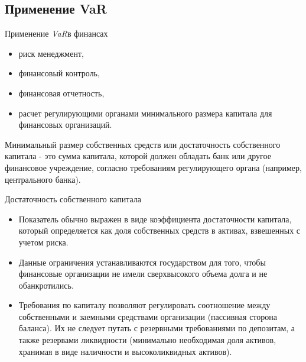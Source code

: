 \documentclass[_fin_decisions_lectures.tex]{subfiles}
\begin{document}
\subsection{Применение VaR}
\begin{frame}{Применение \textit{VaR}в финансах}

\begin{itemize}[<+->]
\item
риск менеджмент, 
\item
финансовый контроль, 
\item
финансовая отчетность,
\item
расчет регулирующими органами минимального размера капитала для финансовых организаций.
\end{itemize}
\end{frame}

\begin{frame}{}
\begin{block}{Минимальный размер собственных средств или достаточность собственного капитала}
\quad - это сумма капитала, которой должен обладать банк или другое финансовое учреждение, согласно требованиям регулирующего органа (например, центрального банка). 

\end{block}
\end{frame}

\begin{frame}[allowframebreaks]{Достаточность собственного капитала}
\begin{itemize}%
\item
Показатель обычно выражен в виде коэффициента достаточности капитала, который определяется как доля собственных средств в активах, взвешенных с учетом риска.
\item
Данные ограничения устанавливаются государством для того, чтобы финансовые организации не имели сверхвысокого объема долга и не обанкротились. 
\pagebreak
\item
Требования по капиталу позволяют регулировать соотношение между собственными и заемными средствами организации (пассивная сторона баланса). Их не следует путать с резервными требованиями по депозитам, а также резервами ликвидности (минимально необходимая доля активов, хранимая в виде наличности и высоколиквидных активов).
\end{itemize}
\end{frame}
\end{document}
